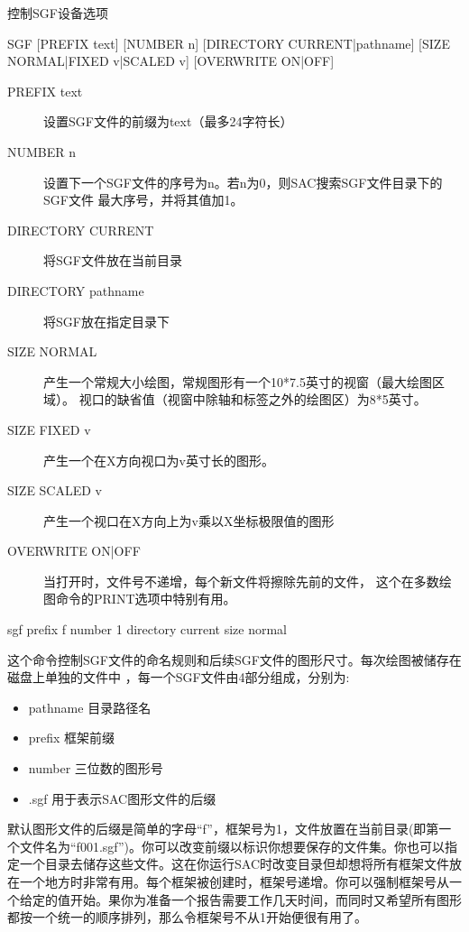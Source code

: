 \label{cmd:sgf}

控制SGF设备选项

\begin{SACSTX}
SGF [PREFIX text] [NUMBER n] [DIRECTORY CURRENT|pathname] 
    [SIZE NORMAL|FIXED v|SCALED v] [OVERWRITE ON|OFF]
\end{SACSTX}

\begin{description}
\item [PREFIX text] 设置SGF文件的前缀为text（最多24字符长）
\item [NUMBER n] 设置下一个SGF文件的序号为n。若n为0，则SAC搜索SGF文件目录下的SGF文件
    最大序号，并将其值加1。
\item [DIRECTORY CURRENT] 将SGF文件放在当前目录 
\item [DIRECTORY pathname] 将SGF放在指定目录下 
\item [SIZE NORMAL] 产生一个常规大小绘图，常规图形有一个10*7.5英寸的视窗（最大绘图区域）。
    视口的缺省值（视窗中除轴和标签之外的绘图区）为8*5英寸。
\item [SIZE FIXED v] 产生一个在X方向视口为v英寸长的图形。 
\item [SIZE SCALED v] 产生一个视口在X方向上为v乘以X坐标极限值的图形  
\item [OVERWRITE ON|OFF] 当打开时，文件号不递增，每个新文件将擦除先前的文件，
    这个在多数绘图命令的PRINT选项中特别有用。 
\end{description}

\begin{SACDFT}
sgf prefix f number 1 directory current size normal
\end{SACDFT}

这个命令控制SGF文件的命名规则和后续SGF文件的图形尺寸。每次绘图被储存在磁盘上单独的文件中
，每一个SGF文件由4部分组成，分别为:
\begin{itemize}
\item pathname 目录路径名
\item prefix 框架前缀
\item number 三位数的图形号
\item .sgf 用于表示SAC图形文件的后缀
\end{itemize}

默认图形文件的后缀是简单的字母``f''，框架号为1，文件放置在当前目录(即第一个文件名为``f001.sgf'')。你可以改变前缀以标识你想要保存的文件集。你也可以指定一个目录去储存这些文件。这在你运行SAC时改变目录但却想将所有框架文件放在一个地方时非常有用。每个框架被创建时，框架号递增。你可以强制框架号从一个给定的值开始。果你为准备一个报告需要工作几天时间，而同时又希望所有图形都按一个统一的顺序排列，那么令框架号不从1开始便很有用了。

